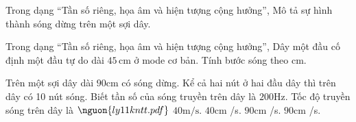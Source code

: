 \begin{ex}
Trong dạng “Tần số riêng, họa âm và hiện tượng cộng hưởng”, Mô tả sự hình thành sóng dừng trên một sợi dây.
\choiceTF

\end{ex}

\begin{ex}
Trong dạng “Tần số riêng, họa âm và hiện tượng cộng hưởng”, Dây một đầu cố định một đầu tự do dài $45\,\text{cm}$ ở mode cơ bản. Tính bước sóng theo cm.
\end{ex}

\begin{ex}
Trên một sợi dây dài $90 \mathrm{cm}$ có sóng dừng. Kể cả hai nút ở hai đầu dây thì trên dây có 10 nút sóng. Biết tần số của sóng truyền trên dây là $200 \mathrm{Hz}$. Tốc độ truyền sóng trên dây là $\nguon{ly11 kntt.pdf}$
\choice
{\True $40 \mathrm{m/s}$.}
{$40 \mathrm{cm}$ /s.}
{$90 \mathrm{cm}$ /s.}
{$90 \mathrm{cm}$ /s.}
\end{ex}

